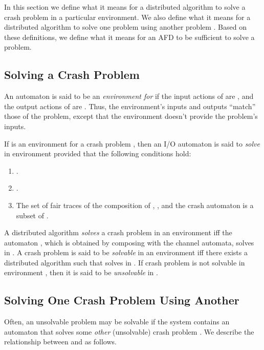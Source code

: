 \documentclass[11pt]{article}
\numberwithin{theorem}{section}
\begin{document}
In this section we define what it means for a distributed algorithm
to solve a crash problem in a particular environment.
We also define what it means for a distributed algorithm to solve one
problem  using another problem . 
Based on these definitions, we define what it means for an AFD to
be sufficient to solve a problem.


\subsection{Solving a Crash Problem}
\label{subsec:solvingCrashProblems}

An automaton  is said to be an \emph{environment for} 
if the input actions of  are , and the output
actions of  are .
Thus, the environment's inputs and outputs ``match'' those of the
problem, except that the environment doesn't provide the problem's
 inputs.

If  is an environment for a crash problem , then an I/O automaton  is said to \emph{solve} 
in environment  provided that the following conditions
hold:
\begin{enumerate}
\item
.
\item
.
\item
The set of fair traces of the composition of , , and
the crash automaton is a subset of .
\end{enumerate}

A distributed algorithm  \emph{solves} a crash problem  in an
environment  iff the automaton , which is
obtained by composing  with the channel automata, solves  in
. 
A crash problem  is said to be \emph{solvable} in an environment
 iff there exists a distributed algorithm  such
that  solves  in . 
If crash problem  is not solvable in environment , then
it is said to be \emph{unsolvable} in .

\subsection{Solving One Crash Problem Using Another}

Often, an unsolvable problem  may be solvable if the system
contains an automaton that solves some \emph{other} (unsolvable) crash
problem . We describe the relationship between  and  as
follows.
\end{document}
